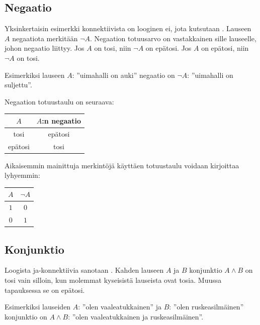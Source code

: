 \subsection*{Negaatio} Yksinkertaisin esimerkki konnektiivista on looginen ei, jota kutsutaan . Lauseen $A$ negaatiota merkitään $\lnot A$. Negaation totuusarvo on vastakkainen sille lauseelle, johon negaatio liittyy. Jos $A$ on tosi, niin $\lnot A$ on epätosi. Jos $A$ on epätosi, niin $\lnot A$ on tosi.

Esimerkiksi lauseen $A$: ''uimahalli on auki'' negaatio on $\lnot A$: ''uimahalli on suljettu''.

Negaation totuustaulu on seuraava:


\bigskip

\begin{center}
\begin{tabular}{|c|c|}\hline
$A$ & $A$:n negaatio \\ \hline
tosi & epätosi \\ 
epätosi & tosi \\
\hline
\end{tabular}
\end{center}

\bigskip

Aikaisemmin mainittuja merkintöjä käyttäen totuustaulu voidaan kirjoittaa lyhyemmin:

\bigskip

\begin{center}
\begin{tabular}{|c|c|}\hline
$A$ & $\lnot A$ \\ \hline
$1$ & $0$\\ 
$0$ & $1$ \\ \hline
\end{tabular}
\end{center}

\bigskip

\subsection*{Konjunktio}
Loogista ja-konnektiivia sanotaan . Kahden lauseen $A$ ja $B$ konjunktio $A\land B$ on tosi vain silloin, kun molemmat kyseisistä lauseista ovat tosia. Muussa tapauksessa se on epätosi.

Esimerkiksi lauseiden $A$: ''olen vaaleatukkainen'' ja $B$: ''olen ruskeasilmäinen'' konjunktio on $A \land B$: ''olen vaaleatukkainen ja ruskeasilmäinen''. 

